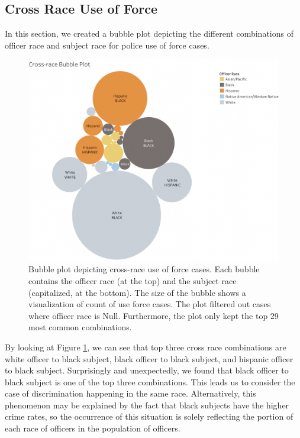 \documentclass[10pt]{article}
\begin{document}
\subsection{Cross Race Use of Force}

In this section, we created a bubble plot depicting the different combinations of officer race and subject race for police use of force cases.

\begin{figure}[h]
\centering
\includegraphics[scale=0.44]{image3.png}
\caption{Bubble plot depicting cross-race use of force cases. Each bubble contains the officer race (at the top) and the subject race (capitalized, at the bottom). The size of the bubble shows a visualization of count of use force cases. The plot filtered out cases where officer race is Null. Furthermore, the plot only kept the top 29 most common combinations.}
\label{fig:crossrace}
\end{figure}


By looking at Figure \ref{fig:crossrace}, we can see that top three cross race combinations are white officer to black subject, black officer to black subject, and hispanic officer to black subject. Surprisingly and unexpectedly, we found that black officer to black subject is one of the top three combinations. This leads us to consider the case of discrimination happening in the same race. Alternatively, this phenomenon may be explained by the fact that black subjects have the higher crime rates, so the occurrence of this situation is solely reflecting the portion of each race of officers in the population of officers.
\end{document}

